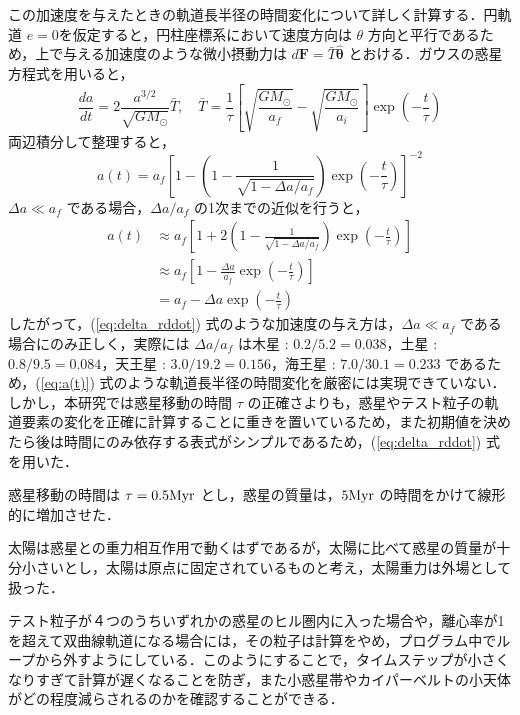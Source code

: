\documentclass[11pt,a4paper,oneside,onecolumn]{jreport}
\begin{document}
この加速度を与えたときの軌道長半径の時間変化について詳しく計算する．円軌道 $e = 0$を仮定すると，円柱座標系において速度方向は $\theta$ 方向と平行であるため，上で与える加速度のような微小摂動力は $d {\bm F} = \bar{T} \hat{\bm \theta}$ とおける．ガウスの惑星方程式を用いると，
\begin{equation}
\frac{d a}{d t} = 2 \frac{a^{3/2}}{\sqrt{G M_{\odot}}} \bar{T}, \quad \bar{T} = \frac{1}{\tau} \left[ \sqrt{\frac{G M_{\odot}}{a_f}} - \sqrt{\frac{G M_{\odot}}{a_i}} \right] \exp \left(- \frac{t}{\tau} \right)
\end{equation}
両辺積分して整理すると，
\begin{equation}
a (t) = a_f \left[ 1 - \left( 1 - \frac{1}{\sqrt{1 - \Delta a/ a_f}} \right) \exp \left( - \frac{t}{\tau} \right) \right]^{-2} \label{eq:a(t)_new}
\end{equation}
$\Delta a \ll a_f$ である場合，$\Delta a/ a_f$ の1次までの近似を行うと，
\begin{equation}
\begin{split}
a (t) & \approx a_f \left[ 1 + 2 \left( 1 - \frac{1}{\sqrt{1 - \Delta a/ a_f}} \right) \exp \left( - \frac{t}{\tau} \right) \right] \\
& \approx a_f \left[ 1 - \frac{\Delta a}{a_f} \exp \left( - \frac{t}{\tau} \right) \right] \\
& = a_f - \Delta a \exp \left( - \frac{t}{\tau} \right)
\end{split}
\label{eq:a(t)_approx}
\end{equation}
したがって，(\ref{eq:delta_rddot}) 式のような加速度の与え方は，$\Delta a \ll a_f$ である場合にのみ正しく，実際には $\Delta a/ a_f$ は木星 : $0.2 / 5.2 = 0.038$，土星 : $0.8 / 9.5 = 0.084$，天王星 : $3.0 /19.2 = 0.156$，海王星 : $7.0 / 30.1 = 0.233$ であるため，(\ref{eq:a(t)}) 式のような軌道長半径の時間変化を厳密には実現できていない．しかし，本研究では惑星移動の時間 $\tau$ の正確さよりも，惑星やテスト粒子の軌道要素の変化を正確に計算することに重きを置いているため，また初期値を決めたら後は時間にのみ依存する表式がシンプルであるため，(\ref{eq:delta_rddot}) 式を用いた．

惑星移動の時間は $\tau = 0.5 {\rm Myr}$ とし，惑星の質量は，$5 {\rm Myr}$ の時間をかけて線形的に増加させた\cite{Minton}．

太陽は惑星との重力相互作用で動くはずであるが，太陽に比べて惑星の質量が十分小さいとし，太陽は原点に固定されているものと考え，太陽重力は外場として扱った．

テスト粒子が４つのうちいずれかの惑星のヒル圏内に入った場合や，離心率が1を超えて双曲線軌道になる場合には，その粒子は計算をやめ，プログラム中でループから外すようにしている．このようにすることで，タイムステップが小さくなりすぎて計算が遅くなることを防ぎ，また小惑星帯やカイパーベルトの小天体がどの程度減らされるのかを確認することができる．
\end{document}
